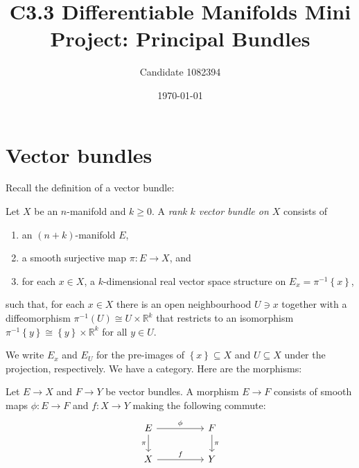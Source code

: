 \documentclass{article}
\begin{document}
\title{C3.3 Differentiable Manifolds Mini Project: Principal Bundles}
\author{Candidate 1082394}
\date{\today}
\maketitle

\section{Vector bundles}

Recall the definition of a vector bundle:

\begin{definition}
  Let $X$ be an $n$-manifold and $k\geq 0$.
  A \emph{rank $k$ vector bundle on $X$} consists of
  \begin{enumerate}
    \item an $(n+k)$-manifold $E$,
    \item a smooth surjective map $\pi : E\to X$, and
    \item for each $x\in X$, a $k$-dimensional real vector space structure on $E_x = {\pi}^{-1}\left\lbrace{x}\right\rbrace$,
  \end{enumerate}
  such that, for each $x\in X$ there is an open neighbourhood $U\ni x$
  together with a diffeomorphism ${\pi}^{-1}(U)\cong U\times\mathbb{R}^k$ that restricts to an isomorphism ${\pi}^{-1}\left\lbrace{y}\right\rbrace\cong\left\lbrace{y}\right\rbrace\times\mathbb{R}^k$ for all $y\in U$.
\end{definition}

We write $E_x$ and $E_U$ for the pre-images of
$\left\lbrace{x}\right\rbrace\subseteq X$ and $U\subseteq X$ under the
projection, respectively. We have a category. Here are the morphisms:

\begin{definition}
  Let $E\to X$ and $F\to Y$ be vector bundles.
  A morphism $E\to F$ consists of smooth maps $\phi:E\to F$ and
  $f:X\to Y$ making the following commute:
  \begin{equation*}
    \begin{tikzcd}
      E && F \\
      X && Y
      \arrow["\phi", from=1-1, to=1-3]
      \arrow["f", from=2-1, to=2-3]
      \arrow["\pi"', from=1-1, to=2-1]
      \arrow["\pi", from=1-3, to=2-3]
    \end{tikzcd}
  \end{equation*}
\end{definition}
\end{document}
